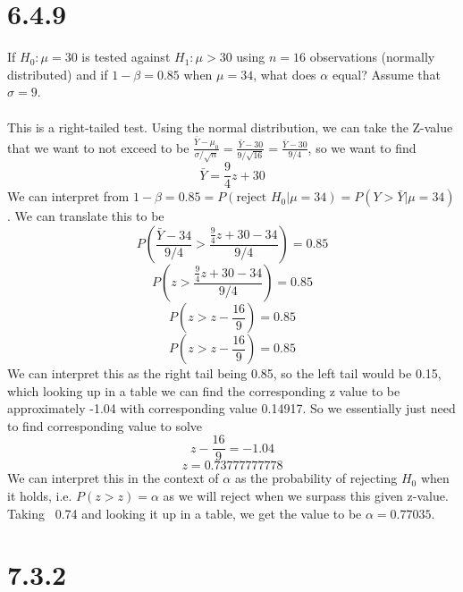 \documentclass{article}
\begin{document}
{\section*{6.4.9}

If \(H_0: \mu = 30\) is tested against \(H_1: \mu > 30\) using \(n = 16\) observations (normally distributed) and if \(1 - \beta = 0.85\) when \(\mu = 34\), what does \(\alpha\) equal? Assume that \(\sigma = 9\).
\\
\\
This is a right-tailed test. Using the normal distribution, we can take the Z-value that we want to not exceed to be \(\frac{\bar{Y} - \mu_0}{\sigma/\sqrt{n}} = \frac{\bar{Y} - 30}{9 / \sqrt{16}} = \frac{\bar{Y} - 30}{9 / 4}\), so we want to find 
\[
\bar{Y} = \frac{9}{4}z + 30
\]
We can interpret from \( 1 - \beta = 0.85 = P(\text{reject } H_0 | \mu = 34) = P(Y > \bar{Y} | \mu = 34)\). We can translate this to be 
\[
P(\frac{\bar{Y} - 34}{9 / 4} > \frac{\frac{9}{4}z + 30 - 34}{9/4}) = 0.85
\]
\[
P(z > \frac{\frac{9}{4}z + 30 - 34}{9/4}) = 0.85
\]
\[
P(z > z - \frac{16}{9}) = 0.85
\]
\[
P(z > z - \frac{16}{9}) = 0.85
\]
We can interpret this as the right tail being 0.85, so the left tail would be 0.15, which looking up in a table we can find the corresponding z value to be approximately -1.04 with corresponding value 0.14917. So we essentially just need to find corresponding value to solve 
\[
z - \frac{16}{9} = -1.04
\]
\[
z = 0.73777777778
\]
We can interpret this in the context of \(\alpha\) as the probability of rejecting \(H_0\) when it holds, i.e. \(P(z > z) = \alpha\) as we will reject when we surpass this given z-value. Taking ~0.74 and looking it up in a table, we get the value to be \(\alpha = 0.77035 \).

\section*{7.3.2}

}
\end{document}
